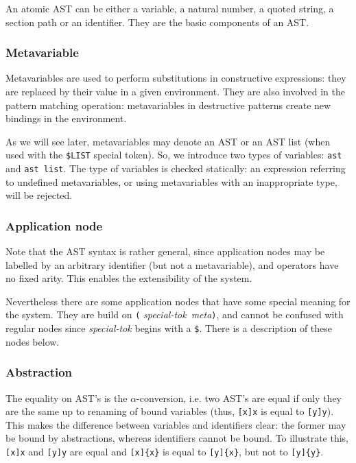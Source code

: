 An atomic AST can be either a variable, a natural number, a quoted
string, a section path or an identifier. They are the basic components
of an AST.

\subsubsection{Metavariable}

Metavariables are used to perform substitutions in constructive
expressions: they are replaced by their value in a given
environment. They are also involved in the pattern matching operation:
metavariables in destructive patterns create new bindings in the
environment.

As we will see later, metavariables may denote an AST or an AST list
(when used with the \verb+$LIST+ special token).
So, we introduce two types of variables: \verb+ast+ and
\verb+ast list+. The type of variables is checked statically: an
expression referring to undefined metavariables, or using metavariables
with an inappropriate type, will be rejected.

\subsubsection{Application node}

Note that the AST syntax is rather general, since application nodes
may be labelled by an arbitrary identifier (but not a metavariable),
and operators have no fixed arity. This enables the extensibility of
the system.

Nevertheless there are some application nodes that have some special
meaning for the system. They are build on \verb+(+{\sl
special-tok}~{\sl meta}\verb+)+, and cannot be confused with regular
nodes since {\sl special-tok} begins with a \verb+$+.
There is a description of these nodes below.

\subsubsection{Abstraction}

The equality on AST's is the $\alpha$-conversion, i.e. two AST's are
equal if only they are the same up to renaming of bound variables
(thus, \verb+[x]x+ is equal to \verb+[y]y+). This makes the difference
between variables and identifiers clear: the former may be bound by
abstractions, whereas identifiers cannot be bound. To illustrate this,
\verb+[x]x+ and \verb+[y]y+ are equal and \verb+[x]{x}+ is equal to
\verb+[y]{x}+, but not to \verb+[y]{y}+.

